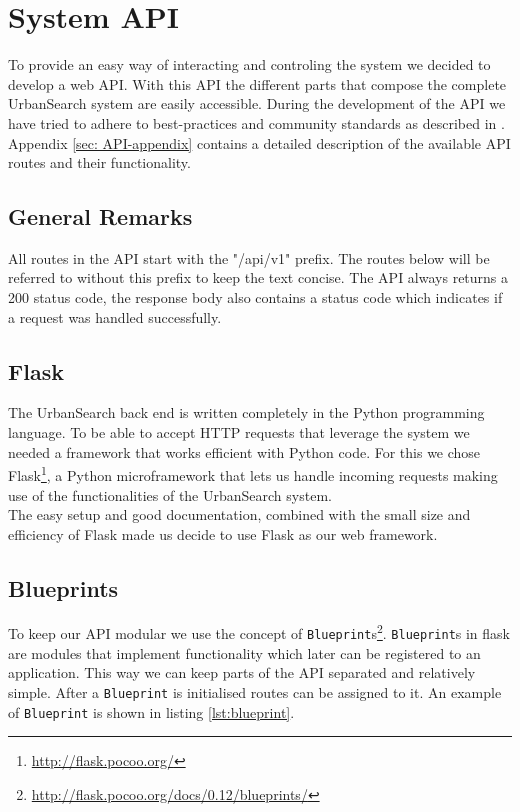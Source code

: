 \section{System API}\label{sec: 5-API}
To provide an easy way of interacting and controling the system we decided to develop a web API. With this API the different parts that compose the complete UrbanSearch system are easily accessible. During the development of the API we have tried to adhere to best-practices and community standards as described in \cite{apigee}. Appendix \ref{sec: API-appendix} contains a detailed description of the available API routes and their functionality.

\subsection{General Remarks}

All routes in the API start with the "/api/v1" prefix. The routes below will be referred to without this prefix to keep the text concise. The API always returns a 200 status code, the response body also contains a status code which indicates if a request was handled successfully.

\subsection{Flask}
The UrbanSearch back end is written completely in the Python programming language. To be able to accept HTTP requests that leverage the system we needed a framework that works efficient with Python code. For this we chose Flask\footnote{\url{http://flask.pocoo.org/}}, a Python microframework that lets us handle incoming requests making use of the functionalities of the UrbanSearch system.\\
The easy setup and good documentation, combined with the small size and efficiency of Flask made us decide to use Flask as our web framework.

\subsection{Blueprints}
To keep our API modular we use the concept of \texttt{Blueprint}s\footnote{\url{http://flask.pocoo.org/docs/0.12/blueprints/}}. \texttt{Blueprint}s in flask are modules that implement functionality which later can be registered to an application. This way we can keep parts of the API separated and relatively simple. After a \texttt{Blueprint} is initialised routes can be assigned to it. An example of \texttt{Blueprint} is shown in listing \ref{lst:blueprint}.\\

